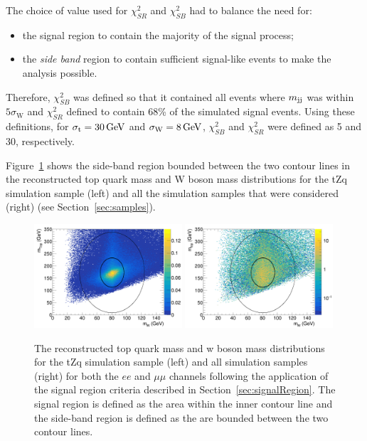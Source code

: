 The choice of value used for $\chi^{2}_{SR}$ and $\chi^{2}_{SB}$ had to balance the need for:
\begin{itemize}
\item the signal region to contain the majority of the signal process;
\item the \emph{side band} region to contain sufficient signal-like events to make the analysis possible.
\end{itemize}

Therefore, $\chi^{2}_{SB}$ was defined so that it contained all events where $m_{\rm jj}$ was within $5 \sigma_{\mathrm{W}}$ and $\chi^{2}_{SR}$ defined to contain 68\% of the  simulated signal events.
Using these definitions, for $\sigma_{\mathrm{t}} = 30\,\text{Ge\hspace{-.08em}V}$ and $\sigma_{\mathrm{W}} = 8\,\text{Ge\hspace{-.08em}V}$, $\chi^{2}_{SB}$ and $\chi^{2}_{SR}$ were defined as 5 and 30, respectively.

Figure~\ref{fig:blindingChi2} shows the side-band region bounded between the two contour lines in the reconstructed top quark mass and W boson mass distributions for the tZq simulation sample (left) and all the simulation samples that were considered (right) (see Section~\ref{sec:samples}).

\begin{figure}[!h]
\centering
\includegraphics[width=0.49\textwidth]{figs/blinding/tZq_topVsWmass.png}
\includegraphics[width=0.49\textwidth]{figs/blinding/all_topVsWmass.png}
\caption{
The reconstructed top quark mass and w boson mass distributions for the tZq simulation sample (left) and all simulation samples (right) for both the $ee$ and $\mu\mu$ channels following the application of the signal region criteria described in Section~\ref{sec:signalRegion}.
The signal region is defined as the area within the inner contour line and the side-band region is defined as the are bounded between the two contour lines.
}
\label{fig:blindingChi2}
\end{figure}

